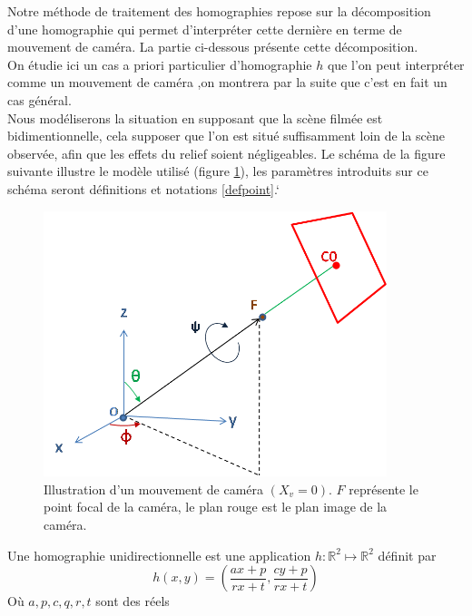 Notre méthode de traitement des homographies repose sur la décomposition d'une homographie qui permet d'interpréter cette dernière en terme de mouvement de caméra. La partie ci-dessous présente cette décomposition.\\
On étudie ici un cas a priori particulier d'homographie $h$   que l'on peut interpréter comme un mouvement de caméra ,on montrera par la suite que c'est en fait un cas général.\\
Nous modéliserons la situation en supposant que la scène filmée est bidimentionnelle, cela supposer que l'on est situé suffisamment loin de la scène observée, afin que les effets du relief soient négligeables. Le schéma de la figure suivante  illustre le modèle utilisé (figure \ref{shmdecomp}), les paramètres introduits sur ce schéma seront définitions et notations \ref{defpoint}.`\\
\begin{figure}[h!]

\centering
\includegraphics[width=10cm]{shema_decomp.png}
\caption{Illustration d'un mouvement de caméra $(X_v =0)$. $F$ représente le point focal de la caméra, le plan rouge est le plan image de la caméra.}
\label{shmdecomp}
\end{figure}
\begin{Def}
Une homographie unidirectionnelle est une application $h:\mathbb{R}^{2} \mapsto \mathbb{R}^{2}$ définit par 
\begin{equation*}
h(x,y)=\left ( \frac{ax+p}{rx+t} , \frac{cy+p}{rx+t} \right)
\end{equation*}
Où $a,p,c,q,r,t$ sont des réels 
\label{homo_uni_direc}
\end{Def}

